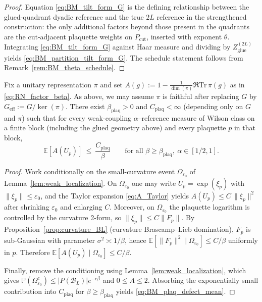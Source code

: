 \begin{proof}
Equation \eqref{eq:BM_tilt_form_G} is the defining relationship between the glued-quadrant dyadic reference and the true $2L$ reference in the strengthened construction: the only additional factors beyond those present in the quadrants are the cut-adjacent plaquette weights on
$P_{\mathrm{cut}}$, inserted with exponent $\theta$.
Integrating \eqref{eq:BM_tilt_form_G} against Haar measure and dividing by $Z_{\mathrm{glue}}^{(2L)}$ yields
\eqref{eq:BM_partition_tilt_form_G}.
The schedule statement follows from Remark~\ref{rem:BM_theta_schedule}.
\end{proof}

\begin{lemma}\label{lem:BM_plaq_defect_mean}
Fix a unitary representation $\pi$ and set $A(g):=1-\frac{1}{\dim(\pi)}\Re\mathrm{Tr}\,\pi(g)$ as in \eqref{eq:RN_factor_beta}.
As above, we may assume $\pi$ is faithful after replacing $G$ by $G_{\mathrm{eff}}:=G/\ker(\pi)$.
There exist $\beta_{\mathrm{plaq}}>0$ and $C_{\mathrm{plaq}}<\infty$ (depending only on $G$ and $\pi$) such that for every weak-coupling
$\alpha$--reference measure of Wilson class on a finite block (including the glued geometry above) and every plaquette $p$ in that block,
\begin{equation}\label{eq:BM_plaq_defect_mean}
\mathbb E[A(U_p)] \ \le\ \frac{C_{\mathrm{plaq}}}{\beta}
\qquad\text{for all }\beta\ge \beta_{\mathrm{plaq}},\ \alpha\in[1/2,1].
\end{equation}
\end{lemma}
\begin{proof}
Work conditionally on the small-curvature event $\Omega_{\varepsilon_0}$ of Lemma~\ref{lem:weak_localization}.
On $\Omega_{\varepsilon_0}$ one may write $U_p=\exp(\xi_p)$ with $\|\xi_p\|\le \varepsilon_0$, and the Taylor expansion \eqref{eq:A_Taylor} yields
$A(U_p)\le C\,\|\xi_p\|^2$ after shrinking $\varepsilon_0$ and enlarging $C$.
Moreover, on $\Omega_{\varepsilon_0}$ the plaquette logarithm is controlled by the curvature 2-form, so $\|\xi_p\|\le C\|F_p\|$.
By Proposition~\ref{prop:curvature_BL} (curvature Brascamp--Lieb domination), $F_p$ is sub-Gaussian with parameter $\sigma^2\asymp 1/\beta$,
hence $\mathbb E[\|F_p\|^2\mid\Omega_{\varepsilon_0}]\le C/\beta$ uniformly in $p$.
Therefore $\mathbb E[A(U_p)\mid\Omega_{\varepsilon_0}]\le C/\beta$.

Finally, remove the conditioning using Lemma~\ref{lem:weak_localization}, which gives
$\mathbb P(\Omega_{\varepsilon_0}^c)\le |P(\mathcal B_L)|e^{-c\beta}$ and $0\le A\le 2$.
Absorbing the exponentially small contribution into $C_{\mathrm{plaq}}$ for $\beta\ge\beta_{\mathrm{plaq}}$ yields \eqref{eq:BM_plaq_defect_mean}.
\end{proof}


